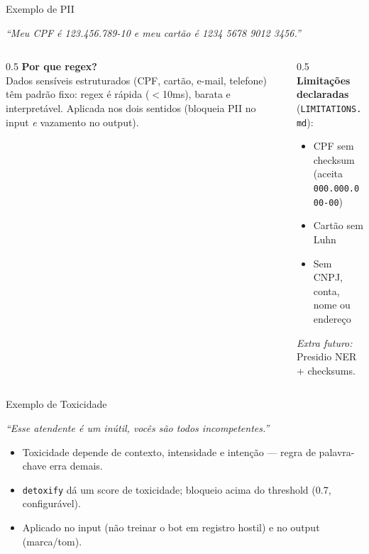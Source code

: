 \documentclass[aspectratio=169,11pt]{beamer}
\newcommand{\promptbox}[1]{%
  \begin{center}%
  \colorbox{cpqdteal!10}{%
    \parbox{0.92\textwidth}{\color{cpqddark}\itshape #1}%
  }%
  \end{center}%
}
\newcommand{\tecnica}[1]{\vspace{0.4em}{\large\textbf{Técnica:}\ \textcolor{cpqdteal!70!black}{#1}}\vspace{0.4em}}
\begin{document}
\begin{frame}{Exemplo de PII}
  \promptbox{``Meu CPF é 123.456.789-10 e meu cartão é 1234 5678 9012 3456.''}
  \tecnica{Regex PT-BR (input e output)}
  \begin{columns}[t]
    \begin{column}{0.5\textwidth}\small
      \textbf{Por que regex?}\\
      Dados sensíveis estruturados (CPF, cartão, e-mail, telefone) têm padrão
      fixo: regex é rápida ($<$10ms), barata e interpretável. Aplicada nos dois
      sentidos (bloqueia PII no input \emph{e} vazamento no output).
    \end{column}
    \begin{column}{0.5\textwidth}\small
      \textbf{Limitações declaradas} (\texttt{LIMITATIONS.md}):
      \begin{itemize}
        \item CPF sem checksum (aceita \texttt{000.000.000-00})
        \item Cartão sem Luhn
        \item Sem CNPJ, conta, nome ou endereço
      \end{itemize}
      \emph{Extra futuro:} Presidio NER + checksums.
    \end{column}
  \end{columns}
\end{frame}

\begin{frame}{Exemplo de Toxicidade}
  \promptbox{``Esse atendente é um inútil, vocês são todos incompetentes.''}
  \tecnica{Classificador detoxify (multilíngue)}
  \vspace{1em}
  \begin{itemize}
    \item Toxicidade depende de contexto, intensidade e intenção --- regra de
    palavra-chave erra demais.
    \vspace{0.5em}
    \item \texttt{detoxify} dá um score de toxicidade; bloqueio acima do
    threshold (0.7, configurável).
    \vspace{0.5em}
    \item Aplicado no input (não treinar o bot em registro hostil) e no output
    (marca/tom).
  \end{itemize}
\end{frame}
\end{document}
